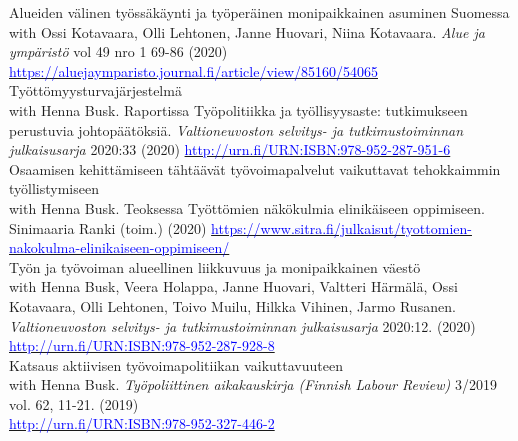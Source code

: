 \documentclass[16pt]{article}
\begin{document}
\noindent Alueiden v\"{a}linen ty\"{o}ss\"{a}k\"{a}ynti ja ty\"{o}per\"{a}inen monipaikkainen asuminen Suomessa \\
\noindent with Ossi Kotavaara, Olli Lehtonen, Janne Huovari, Niina Kotavaara. \textit{Alue ja ympäristö} vol 49 nro 1 69-86 (2020) \href{https://aluejaymparisto.journal.fi/article/view/85160/54065}{\textcolor{blue}{https://aluejaymparisto.journal.fi/article/view/85160/54065}} \\
 
\noindent Ty\"{o}tt\"{o}myysturvaj\"{a}rjestelm\"{a} \\
\noindent with Henna Busk. Raportissa Ty\"{o}politiikka ja ty\"{o}llisyysaste: tutkimukseen perustuvia johtop\"{a}\"{a}t\"{o}ksi\"{a}. \textit{Valtioneuvoston selvitys- ja tutkimustoiminnan julkaisusarja} 2020:33 (2020) \href{http://urn.fi/URN:ISBN:978-952-287-951-6}{\textcolor{blue}{http://urn.fi/URN:ISBN:978-952-287-951-6}} \\

\noindent Osaamisen kehitt\"{a}miseen t\"{a}ht\"{a}\"{a}v\"{a}t ty\"{o}voimapalvelut vaikuttavat tehokkaimmin ty\"{o}llistymiseen \\
\noindent with Henna Busk. Teoksessa Työttömien näkökulmia elinikäiseen oppimiseen. Sinimaaria Ranki (toim.) (2020) \href{https://www.sitra.fi/julkaisut/tyottomien-nakokulma-elinikaiseen-oppimiseen/}{\textcolor{blue}{https://www.sitra.fi/julkaisut/tyottomien-nakokulma-elinikaiseen-oppimiseen/}} \\

\noindent Ty\"{o}n ja ty\"{o}voiman alueellinen liikkuvuus ja monipaikkainen v\"{a}est\"{o} \\
\noindent with Henna Busk, Veera Holappa, Janne Huovari, Valtteri H\"{a}rm\"{a}l\"{a}, Ossi Kotavaara, Olli Lehtonen, Toivo Muilu, Hilkka Vihinen, Jarmo Rusanen. \textit{Valtioneuvoston selvitys- ja tutkimustoiminnan julkaisusarja} 2020:12. (2020) \href{http://urn.fi/URN:ISBN:978-952-287-928-8}{\textcolor{blue}{http://urn.fi/URN:ISBN:978-952-287-928-8}} \\

\noindent Katsaus aktiivisen ty\"{o}voimapolitiikan vaikuttavuuteen \\
\noindent with Henna Busk. \textit{Ty\"{o}poliittinen aikakauskirja (Finnish Labour Review)} 3/2019 vol. 62, 11-21.  (2019) \\
\noindent \href{http://urn.fi/URN:ISBN:978-952-327-446-2}{\textcolor{blue}{http://urn.fi/URN:ISBN:978-952-327-446-2}} \\
\end{document}
